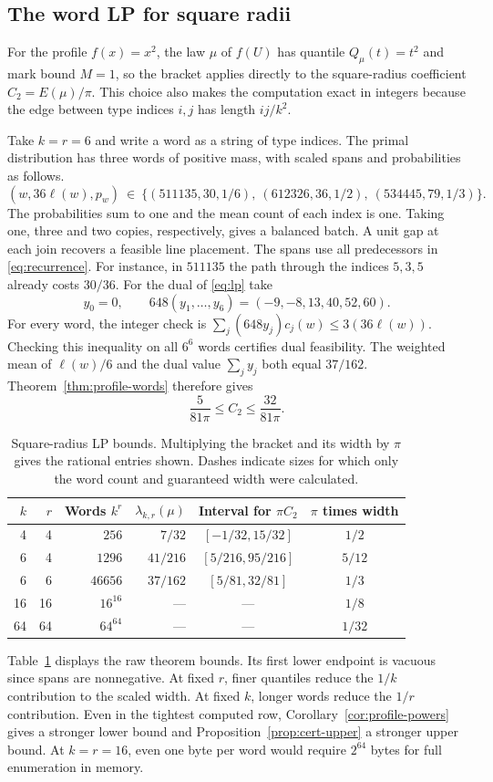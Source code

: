 \subsection{The word LP for square radii}\label{sec:worked-lp-example}

For the profile $f(x)=x^2$, the law $\mu$ of $f(U)$ has quantile
$Q_\mu(t)=t^2$ and mark bound $M=1$, so the bracket applies directly to
the square-radius coefficient $C_2=E(\mu)/\pi$.
This choice also makes the computation exact in integers because the edge between
type indices $i,j$ has length $ij/k^2$.

Take $k=r=6$ and write a word as a string of type indices.
The primal distribution has three words of positive mass, with scaled
spans and probabilities as follows.
\[
 (w,36\ell(w),p_w)\ \in\
 \{(511135,30,1/6),\ (612326,36,1/2),\ (534445,79,1/3)\}.
\]
The probabilities sum to one and the mean count of each index is one.
Taking one, three and two copies, respectively, gives a balanced batch.
A unit gap at each join recovers a feasible line placement.
The spans use all predecessors in \eqref{eq:recurrence}. For instance, in
$511135$ the path through the indices $5,3,5$ already costs $30/36$.
For the dual of \eqref{eq:lp} take
\[
 y_0=0,\qquad 648(y_1,\ldots,y_6)=(-9,-8,13,40,52,60).
\]
For every word, the integer check is
$\sum_j(648y_j)c_j(w)\le 3(36\ell(w))$.
Checking this inequality on all $6^6$ words certifies dual feasibility.
The weighted mean of $\ell(w)/6$ and the dual value $\sum_j y_j$ both
equal $37/162$. Theorem~\ref{thm:profile-words} therefore gives
\[
 \frac{5}{81\pi}\le C_2\le\frac{32}{81\pi}.
\]

\begin{table}[htbp]
\centering
\caption{Square-radius LP bounds. Multiplying the bracket and its width by
$\pi$ gives the rational entries shown. Dashes indicate sizes for which
only the word count and guaranteed width were calculated.}
\label{tab:worked-lp-example}
\begin{tabular}{rrrrcc}
\toprule
$k$ & $r$ & Words $k^r$ & $\lambda_{k,r}(\mu)$ &
Interval for $\pi C_2$ & $\pi$ times width \\
\midrule
4 & 4 & $256$ & $7/32$ & $[-1/32,15/32]$ & $1/2$ \\
6 & 4 & $1296$ & $41/216$ & $[5/216,95/216]$ & $5/12$ \\
6 & 6 & $46656$ & $37/162$ & $[5/81,32/81]$ & $1/3$ \\
16 & 16 & $16^{16}$ & --- & --- & $1/8$ \\
64 & 64 & $64^{64}$ & --- & --- & $1/32$ \\
\bottomrule
\end{tabular}
\end{table}

Table~\ref{tab:worked-lp-example} displays the raw theorem bounds. Its
first lower endpoint is vacuous since spans are nonnegative.
At fixed $r$, finer quantiles reduce the $1/k$ contribution to the scaled
width. At fixed $k$, longer words reduce the $1/r$ contribution.
Even in the tightest computed row, Corollary~\ref{cor:profile-powers}
gives a stronger lower bound and Proposition~\ref{prop:cert-upper} a
stronger upper bound. At $k=r=16$, even one byte per word would require
$2^{64}$ bytes for full enumeration in memory.
